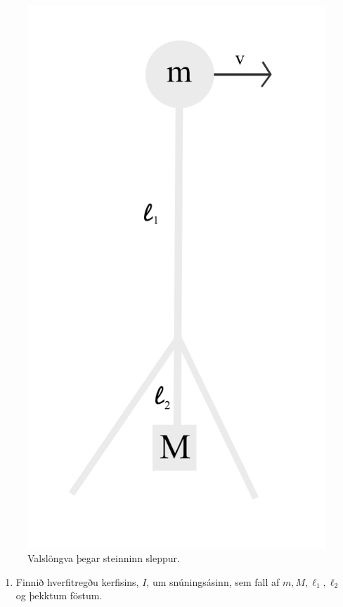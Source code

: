 \begin{enumerate}[label = \textbf{Dæmi \thechapter.\arabic*.}]
\begin{figure}[ht]
\begin{minipage}[b]{0.65\linewidth}
    \includegraphics[scale = 0.8]{images/al.png}
    \caption{Valslöngva þegar steinninn sleppur.}
    \label{throw}
\end{minipage}
\end{figure}

\begin{enumerate}[label=\textbf{(\alph*)}]
    \item Finnið hverfitregðu kerfisins, $I$, um snúningsásinn, sem fall af $m, M, \ell_1, \ell_2$ og þekktum föstum.
    

\end{enumerate}
\end{enumerate}
